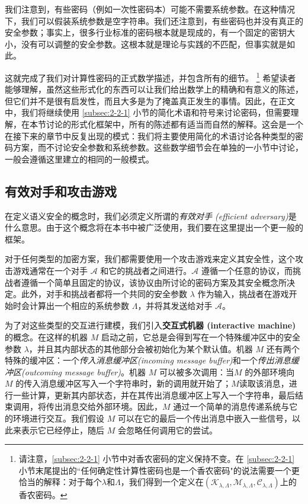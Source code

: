 我们注意到，有些密码（例如一次性密码本）可能不需要系统参数。在这种情况下，我们可以假装系统参数是空字符串。我们还注意到，有些密码也并没有真正的安全参数；事实上，很多行业标准的密码根本就是现成的，有一个固定的密钥大小，没有可以调整的安全参数。这根本就是理论与实践的不匹配，但事实就是如此。

这就完成了我们对计算性密码的正式数学描述，并包含所有的细节。
\footnote{
请注意，\ref{subsec:2-2-1} 小节中对香农密码的定义保持不变。在 \ref{subsec:2-2-1} 小节末尾提出的``任何确定性计算性密码也是一个香农密码"的说法需要一个更恰当的解释：对于每个$\lambda$和$\Lambda$，我们得到一个定义在$(\mathcal{K}_{\lambda,\Lambda},\mathcal{M}_{\lambda,\Lambda},\mathcal{C}_{\lambda,\Lambda})$上的香农密码。
}
希望读者能够理解，虽然这些形式化的东西可以让我们给出数学上的精确和有意义的陈述，但它们并不是很有启发性，而且大多是为了掩盖真正发生的事情。因此，在正文中，我们将继续使用 \ref{subsec:2-2-1} 小节的简化术语和符号来讨论密码，但需要理解，在本节讨论的形式化框架中，所有的陈述都有适当而自然的解释。这会是一个在接下来的章节中反复出现的模式：我们将主要使用简化的术语讨论各种类型的密码方案，而不讨论安全参数和系统参数。这些数学细节会在单独的一小节中讨论，一般会遵循这里建立的相同的一般模式。

\subsection{有效对手和攻击游戏}

在定义语义安全的概念时，我们必须定义所谓的\emph{有效对手 (efficient adversary)}是什么意思。由于这个概念将在本书中被广泛使用，我们要在这里提出一个更一般的框架。

对于任何类型的加密方案，我们都需要使用一个攻击游戏来定义其安全性，这个攻击游戏通常在一个对手 $\mathcal{A}$ 和它的挑战者之间进行。$\mathcal{A}$ 遵循一个任意的协议，而挑战者遵循一个简单且固定的协议，该协议由所讨论的密码方案及其安全概念所决定。此外，对手和挑战者都将一个共同的安全参数 $\lambda$ 作为输入，挑战者在游戏开始时会计算出一个相应的系统参数 $\Lambda$，并将其发送给对手 $\mathcal{A}$。

为了对这些类型的交互进行建模，我们引入\textbf{交互式机器 (interactive machine)}的概念。在这样的机器 $M$ 启动之前，它总是会得到写在一个特殊缓冲区中的安全参数 $\lambda$，并且其内部状态的其他部分会被初始化为某个默认值。机器 $M$ 还有两个特殊的缓冲区：一个\emph{传入消息缓冲区(incoming message buffer)}和一个\emph{传出消息缓冲区(outcoming message buffer)}。机器 $M$ 可以被多次调用：当$M$ 的外部环境向 $M$ 的传入消息缓冲区写入一个字符串时，新的调用就开始了；$M$读取该消息，进行一些计算，更新其内部状态，并在其传出消息缓冲区上写入一个字符串，最后结束调用，将传出消息交给外部环境。因此，$M$ 通过一个简单的消息传递系统与它的环境进行交互。我们假设 $M$ 可以在它的最后一个传出消息中嵌入一些信号，以此来表示它已经停止，随后 $M$ 会忽略任何调用它的尝试。

